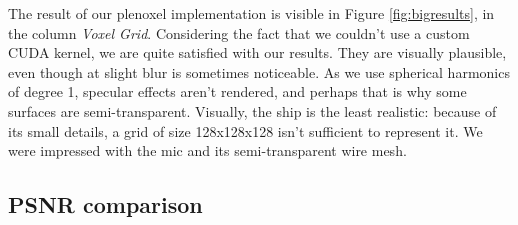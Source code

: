 \documentclass{article}
\begin{document}
%

The result of our plenoxel implementation is visible in Figure \ref{fig:bigresults}, in the column \textit{Voxel Grid}. Considering the fact that we couldn't use a custom CUDA kernel, we are quite satisfied with our results. They are visually plausible, even though at slight blur is sometimes noticeable. As we use spherical harmonics of degree 1, specular effects aren't rendered, and perhaps that is why some surfaces are semi-transparent. Visually, the ship is the least realistic: because of its small details, a grid of size 128x128x128 isn't sufficient to represent it. We were impressed with the mic and its semi-transparent wire mesh.

\subsection{PSNR comparison}
\end{document}
